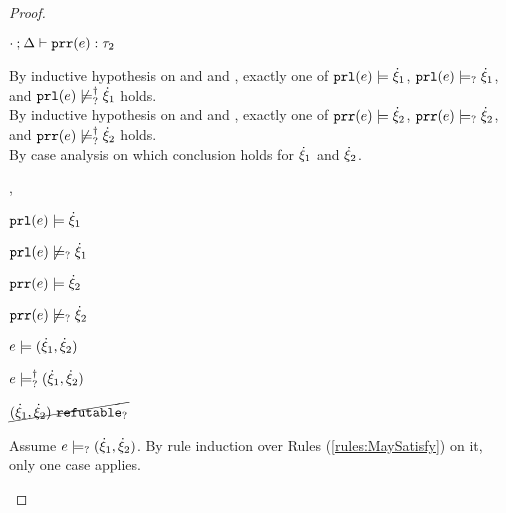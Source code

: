 \begin{proof}
\begin{byCases}
\begin{byCases}
\begin{pfsteps*}
        \item $\cdot \mathbin{;} \Delta \vdash \mathtt{prr}(e) : \tau_2$  
        \end{pfsteps*}
        By inductive hypothesis on  and  and , exactly one of $\mathtt{prl}(e) \models \dot{\xi}_1$, $\mathtt{prl}(e) \models_{?} \dot{\xi}_1$, and $\mathtt{prl}(e) \not\models_{?}^{\dag} \dot{\xi}_1$ holds. \\
        By inductive hypothesis on  and  and , exactly one of $\mathtt{prr}(e) \models \dot{\xi}_2$, $\mathtt{prr}(e) \models_{?} \dot{\xi}_2$, and $\mathtt{prr}(e) \not\models_{?}^{\dag} \dot{\xi}_2$ holds. \\
        By case analysis on which conclusion holds for $\dot{\xi}_1$ and $\dot{\xi}_2$.
        \begin{byCases}
        \item[\csatisfy{\hprl{e}}{\hxi_1},\csatisfy{\hprr{e}}{\hxi_2}]
            \begin{pfsteps*}
            \item $\mathtt{prl}(e) \models \dot{\xi}_1$  
            \item $\mathtt{prl}(e) \not\models_{?} \dot{\xi}_1$  
            \item $\mathtt{prr}(e) \models \dot{\xi}_2$  
            \item $\mathtt{prr}(e) \not\models_{?} \dot{\xi}_2$  
            \item $e \models (\dot{\xi}_1 , \dot{\xi}_2)$  
            \item $e \models_{?}^{\dag} (\dot{\xi}_1 , \dot{\xi}_2)$ 
            \item $\cancel{(\dot{\xi}_1 , \dot{\xi}_2) ~\mathtt{refutable}_?}$  
            \end{pfsteps*}
            Assume $e \models_{?} (\dot{\xi}_1 , \dot{\xi}_2)$. By rule induction over Rules (\ref{rules:MaySatisfy}) on it, only one case applies.
            \begin{byCases}

\end{byCases}
\end{byCases}
\end{byCases}
\end{byCases}
\end{proof}

